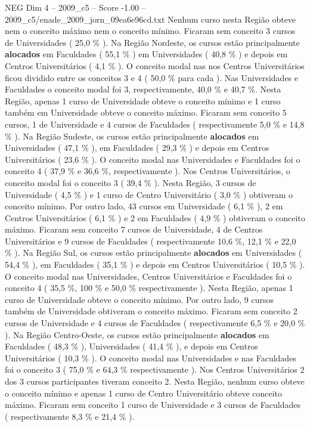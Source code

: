 \begin{textsample}{NEG Dim 4 – 2009\_c5 – Score -1.00 – 2009\_c5/enade\_2009\_jorn\_09ea6e96cd.txt}
Nenhum curso nesta Região obteve nem o conceito máximo nem o conceito mínimo.
Ficaram sem conceito 3 cursos de Universidades ( 25,0 \% ).
Na Região Nordeste, os cursos estão principalmente \textbf{alocados} em Faculdades ( 55,1 \% ) em Universidades ( 40,8 \% ) e depois em Centros Universitários ( 4,1 \% ).
O conceito modal nas nos Centros Universitários ficou dividido entre os conceitos 3 e 4 ( 50,0 \% para cada ).
Nas Universidades e Faculdades o conceito modal foi 3, respectivamente, 40,0 \% e 40,7 \%.
Nesta Região, apenas 1 curso de Universidade obteve o conceito mínimo e 1 curso também em Universidade obteve o conceito máximo.
Ficaram sem conceito 5 cursos, 1 de Universidade e 4 cursos de Faculdades ( respectivamente 5,0 \% e 14,8 \% ).
Na Região Sudeste, os cursos estão principalmente \textbf{alocados} em Universidades ( 47,1 \% ), em Faculdades ( 29,3 \% ) e depois em Centros Universitários ( 23,6 \% ).
O conceito modal nas Universidades e Faculdades foi o conceito 4 ( 37,9 \% e 36,6 \%, respectivamente ).
Nos Centros Universitários, o conceito modal foi o conceito 3 ( 39,4 \% ).
Nesta Região, 3 cursos de Universidade ( 4,5 \% ) e 1 curso de Centro Universitário ( 3,0 \% ) obtiveram o conceito mínimo.
Por outro lado, 43 cursos em Universidade ( 6,1 \% ), 2 em Centros Universitários ( 6,1 \% ) e 2 em Faculdades ( 4,9 \% ) obtiveram o conceito máximo.
Ficaram sem conceito 7 cursos de Universidade, 4 de Centros Universitários e 9 cursos de Faculdades ( respectivamente 10,6 \%, 12,1 \% e 22,0 \% ).
Na Região Sul, os cursos estão principalmente \textbf{alocados} em Universidades ( 54,4 \% ), em Faculdades ( 35,1 \% ) e depois em Centros Universitários ( 10,5 \% ).
O conceito modal nas Universidades, Centros Universitários e Faculdades foi o conceito 4 ( 35,5 \%, 100 \% e 50,0 \% respectivamente ).
Nesta Região, apenas 1 curso de Universidade obteve o conceito mínimo.
Por outro lado, 9 cursos também de Universidade obtiveram o conceito máximo.
Ficaram sem conceito 2 cursos de Universidade e 4 cursos de Faculdades ( respectivamente 6,5 \% e 20,0 \% ).
Na Região Centro-Oeste, os cursos estão principalmente \textbf{alocados} em Faculdades ( 48,3 \% ), Universidades ( 41,4 \% ), e depois em Centros Universitários ( 10,3 \% ).
O conceito modal nas Universidades e nas Faculdades foi o conceito 3 ( 75,0 \% e 64,3 \% respectivamente ).
Nos Centros Universitários 2 dos 3 cursos participantes tiveram conceito 2.
Nesta Região, nenhum curso obteve o conceito mínimo e apenas 1 curso de Centro Universitário obteve conceito máximo.
Ficaram sem conceito 1 curso de Universidade e 3 cursos de Faculdades ( respectivamente 8,3 \% e 21,4 \% ).

\end{textsample}
